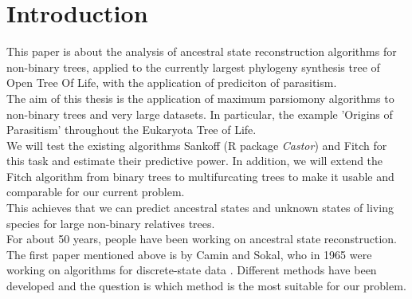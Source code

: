 \tableofcontents
\clearpage

\chapter{Introduction}
  This paper is about the analysis of ancestral state reconstruction algorithms for non-binary trees, 
    applied to the currently largest phylogeny synthesis tree of Open Tree Of Life, with the 
    application of prediciton of parasitism. \\
   The aim of this thesis is the application of maximum parsiomony algorithms to non-binary 
    trees and very large datasets. In particular, the example 'Origins of Parasitism' throughout the 
    Eukaryota Tree of Life. \\
  We will test the existing algorithms Sankoff (R package \textit{Castor}\cite{Louca2017}) and Fitch 
    for this task and estimate their predictive power. In addition, we will extend the Fitch 
    algorithm from binary trees to multifurcating trees to make it usable and comparable for our 
    current problem. \\
  This achieves that we can predict ancestral states and unknown states of living species for large 
    non-binary relatives trees. \\

  For about 50 years, people have been working on ancestral state reconstruction. The first paper 
    mentioned above is by Camin and Sokal, who in 1965 were working on algorithms for discrete-state 
    data \cite{Camin1965}. Different methods have been developed and the question is which method is 
    the most suitable for our problem. \\

   \\

